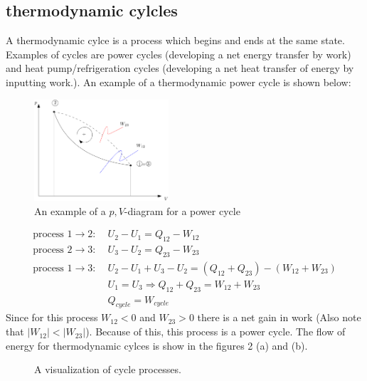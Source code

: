 \documentclass[11pt, a4paper]{article}
\begin{document}
\subsection{thermodynamic cylcles}
A thermodynamic cylce is a process which begins and ends at the same state. Examples of cycles are power cycles (developing a net energy transfer by work) and heat pump/refrigeration cycles (developing a net heat transfer of energy by inputting work.). An example of a thermodynamic power cycle is shown below:
\begin{figure}[h]
  \centerline{\includegraphics[width=50mm]{images/Power_Cycle.png}}
  \caption{An example of a $p,V$-diagram for a power cycle}
\end{figure}
\begin{align}
  \text{process } 1 \to 2:\; &U_2 - U_1 = Q_{12} - W_{12}\\
  \text{process } 2 \to 3:\; &U_3 - U_2 = Q_{23} - W_{23}\\
  \text{process } 1 \to 3:\; &U_2 - U_1 + U_3 - U_2 = (Q_{12} + Q_{23}) - (W_{12} + W_{23})\\
                             &U_1 = U_3 \Rightarrow Q_{12} + Q_{23} = W_{12} + W_{23}\\
                             &Q_{cycle} = W_{cycle}
\end{align}
Since for this process $W_{12} < 0$ and $W_{23} > 0$ there is a net gain in work (Also note that $|W_{12}| < |W_{23}|$). Because of this, this process is a power cycle.
The flow of energy for thermodynamic cylces is show in the figures 2 (a) and (b).
\begin{figure}[h]
  \centering
  \qquad
  \caption{A visualization of cycle processes.}
\end{figure}
\end{document}
